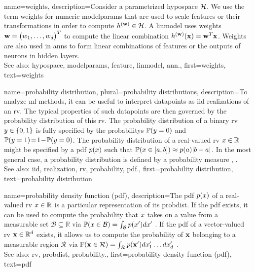 {name={weights},
 description={Consider a parametrized \gls{hypospace} $\mathcal{H}$. We use the term 
 	weights for numeric \gls{modelparams} that are used to scale \glspl{feature} or their transformations 
 	in order to compute $h^{({\bf w})} \in \mathcal{H}$. A \gls{linmodel} uses weights 
	${\bf w}=\big(w_{1},\ldots,w_{d}\big)^{T}$ to compute the linear combination 
 	$h^{({\bf w})}({\bf x})= {\bf w}^{T} {\bf x}$. Weights are also used in \glspl{ann} 
 	to form linear combinations of \glspl{feature} or the outputs of neurons in hidden layers.
				\\
		See also: \gls{hypospace}, \gls{modelparams}, \gls{feature}, \gls{linmodel}, \gls{ann}.},
	first={weights},
	text={weights}
}
	
{name={probability distribution}, 
 plural={probability distributions},
 description={To analyze \gls{ml} methods, it can be useful 
		to interpret \glspl{datapoint} as \gls{iid} \glspl{realization} of an \gls{rv}. The typical 
		properties of such \glspl{datapoint} are then governed by the \gls{probability} distribution 
		of this \gls{rv}. The \gls{probability} distribution of a binary \gls{rv} $y \in \{0,1\}$ 
		is fully specified by the \glspl{probability} $\mathbb{P}({y = 0})$ and 
		$\mathbb{P}({y=1})\!=\!1\!-\!\mathbb{P}({y=0})$. The \gls{probability} 
		distribution of a real-valued \gls{rv} $x \in \mathbb{R}$ might be specified 
		by a \gls{pdf} $p(x)$ such that $\mathbb{P}({ x \in [a,b] }) \approx  p(a) |b-a|$. 
	    	In the most general case, a \gls{probability} distribution is defined by a \gls{probability} measure \cite{BillingsleyProbMeasure}, \cite{GrayProbBook}.
	    		\\
		See also: \gls{iid}, \gls{realization}, \gls{rv}, \gls{probability}, \gls{pdf}.},
	first={probability distribution},
	text={probability distribution}
}
    
    
{name={probability density function (pdf)},
 description={The pdf $p(x)$ of a real-valued \gls{rv} 
 	$x \in \mathbb{R}$ is a particular representation of its \gls{probdist}. If the pdf exists, it can 
 	be used to compute the \gls{probability} that $x$ takes on a value from a measurable set 
 	$\mathcal{B} \subseteq \mathbb{R}$ via $\mathbb{P}({x \in \mathcal{B}}) = \int_{\mathcal{B}} p(x') d x'$ \cite[Ch. 3]{BertsekasProb}. 
	If the pdf of a vector-valued \gls{rv} ${\bf x} \in \mathbb{R}^{d}$ exists, it 
     allows us to compute the \gls{probability} of ${\bf x}$ belonging to a measurable region $\mathcal{R}$ via 
        $\mathbb{P}({{\bf x} \in \mathcal{R}}) = \int_{\mathcal{R}} p({\bf x}') d x_{1}' \ldots d x_{d}' $ \cite[Ch. 3]{BertsekasProb}.
        		\\
		See also: \gls{rv}, \gls{probdist}, \gls{probability}.},
first={probability density function (pdf)},
text={pdf}
}


